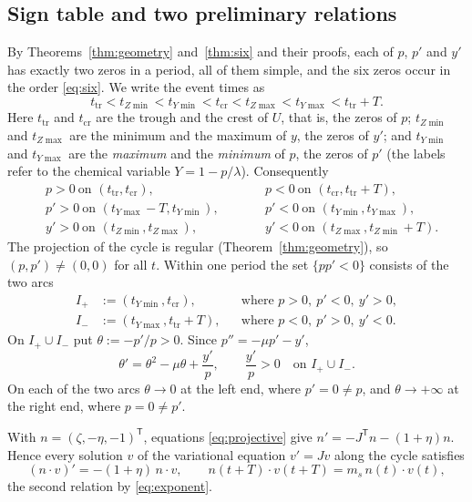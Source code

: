 \subsection{Sign table and two preliminary relations}\label{wk:sec:signs}
By Theorems~\ref{thm:geometry} and~\ref{thm:six} and their proofs, each of $p$, $p'$ and $y'$ has exactly two zeros in a period, all of them simple, and the six zeros occur in the order \eqref{eq:six}. We write the event times as
\begin{equation}\label{wk:eq:events}
t_{\mathrm{tr}}<t_{Z\min}<t_{Y\min}<t_{\mathrm{cr}}<t_{Z\max}<t_{Y\max}<t_{\mathrm{tr}}+T .
\end{equation}
Here $t_{\mathrm{tr}}$ and $t_{\mathrm{cr}}$ are the trough and the crest of $U$, that is, the zeros of $p$; $t_{Z\min}$ and $t_{Z\max}$ are the minimum and the maximum of $y$, the zeros of $y'$; and $t_{Y\min}$ and $t_{Y\max}$ are the \emph{maximum} and the \emph{minimum} of $p$, the zeros of $p'$ (the labels refer to the chemical variable $Y=1-p/\lambda$). Consequently
\begin{equation}\label{wk:eq:signs}
\begin{aligned}
&p>0\ \text{on }(t_{\mathrm{tr}},t_{\mathrm{cr}}),&\qquad&p<0\ \text{on }(t_{\mathrm{cr}},t_{\mathrm{tr}}+T),\\
&p'>0\ \text{on }(t_{Y\max}-T,t_{Y\min}),&&p'<0\ \text{on }(t_{Y\min},t_{Y\max}),\\
&y'>0\ \text{on }(t_{Z\min},t_{Z\max}),&&y'<0\ \text{on }(t_{Z\max},t_{Z\min}+T).
\end{aligned}
\end{equation}
The projection of the cycle is regular (Theorem~\ref{thm:geometry}), so $(p,p')\ne(0,0)$ for all $t$. Within one period the set $\{pp'<0\}$ consists of the two arcs
\begin{align*}
I_+&:=(t_{Y\min},t_{\mathrm{cr}}),&&\text{where }p>0,\ p'<0,\ y'>0,\\
I_-&:=(t_{Y\max},t_{\mathrm{tr}}+T),&&\text{where }p<0,\ p'>0,\ y'<0 .
\end{align*}
On $I_+\cup I_-$ put $\theta:=-p'/p>0$. Since $p''=-\mu p'-y'$,
\begin{equation}\label{wk:eq:theta}
\theta'=\theta^2-\mu\theta+\frac{y'}{p},\qquad \frac{y'}{p}>0\quad\text{on }I_+\cup I_- .
\end{equation}
On each of the two arcs $\theta\to0$ at the left end, where $p'=0\ne p$, and $\theta\to+\infty$ at the right end, where $p=0\ne p'$.

With $n=(\zeta,-\eta,-1)^{\mathsf T}$, equations \eqref{eq:projective} give $n'=-J^{\mathsf T}n-(1+\eta)n$. Hence every solution $v$ of the variational equation $v'=Jv$ along the cycle satisfies
\begin{equation}\label{wk:eq:ndecay}
(n\cdot v)'=-(1+\eta)\,n\cdot v,\qquad n(t+T)\cdot v(t+T)=m_s\,n(t)\cdot v(t),
\end{equation}
the second relation by \eqref{eq:exponent}.


